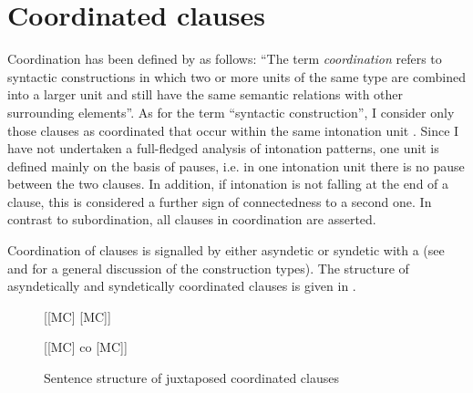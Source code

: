 
\section{Coordinated clauses}\label{sec:Coordination}

Coordination has been defined by \citet[34]{Haspelmath2004} as follows: “The term \textit{coordination} refers to syntactic constructions in which two or more units of the same type are combined into a larger unit and still have the same semantic relations with other surrounding elements”. As for the term “syntactic construction”, I consider only those clauses as coordinated that occur within the same intonation unit \citep[332]{Mithun1988}. Since I have not undertaken a full-fledged analysis of intonation patterns, one  unit is defined mainly on the basis of pauses, i.e. in one intonation unit there is no pause between the two clauses. In addition, if intonation is not falling at the end of a clause, this is considered a further sign of connectedness to a second one. In contrast to subordination, all clauses in coordination are asserted.

Coordination of clauses is signalled by either asyndetic  or syndetic  with a  (see  and  for a general discussion of the construction types). The structure of asyndetically and syndetically coordinated clauses is given in .

\begin{figure}[!ht]


[[MC] [MC]]

[[MC] co [MC]]
\caption{Sentence structure of juxtaposed coordinated clauses}
\label{fig:CoordinationStructure}

\end{figure}

